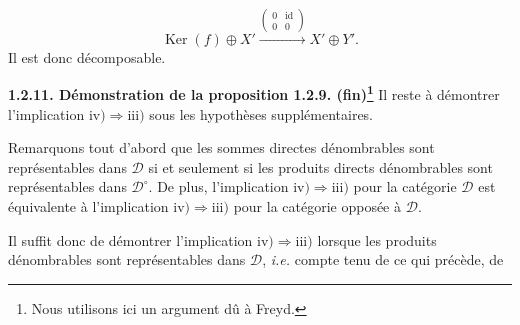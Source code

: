 \[
  \operatorname{Ker}(f)\oplus X'
  \xrightarrow{\left(\begin{smallmatrix}0&\operatorname{id}\\0&0\end{smallmatrix}\right)}
  X'\oplus Y'.
\]
Il est donc décomposable.

\medskip
\noindent\textbf{1.2.11. Démonstration de la proposition 1.2.9.
(fin)\footnote{Nous utilisons ici un argument dû à Freyd.}}
Il reste à démontrer l'implication
$\mathrm{iv)}\Longrightarrow\mathrm{iii)}$ sous les hypothèses
supplémentaires.

Remarquons tout d'abord que les sommes directes dénombrables sont
représentables dans $\mathcal D$ si et seulement si les produits directs
dénombrables sont représentables dans $\mathcal D^{\circ}$. De plus,
l'implication $\mathrm{iv)}\Longrightarrow\mathrm{iii)}$ pour la catégorie
$\mathcal D$ est équivalente à l'implication
$\mathrm{iv)}\Longrightarrow\mathrm{iii)}$ pour la catégorie opposée à
$\mathcal D$.

Il suffit donc de démontrer l'implication
$\mathrm{iv)}\Longrightarrow\mathrm{iii)}$ lorsque les produits
dénombrables sont représentables dans $\mathcal D$, \textit{i.e.} compte
tenu de ce qui précède, de
\endgroup
